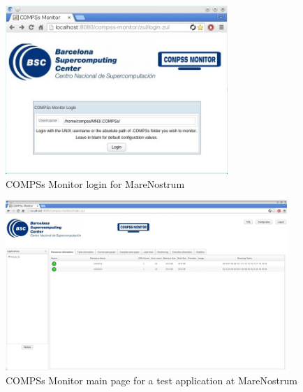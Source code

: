 \begin{figure}[h!]
  \centering
    \includegraphics[width=0.75\textwidth]{./Sections/4_Monitor/Figures/mn_monitor1.jpeg}
    \caption{COMPSs Monitor login for MareNostrum}
\end{figure}
\label{fig:mn_monitor1}

\begin{figure}[h!]
  \centering
    \includegraphics[width=0.95\textwidth]{./Sections/4_Monitor/Figures/mn_monitor2.jpeg}
    \caption{COMPSs Monitor main page for a test application at MareNostrum}
\end{figure}
\label{fig:mn_monitor2}


